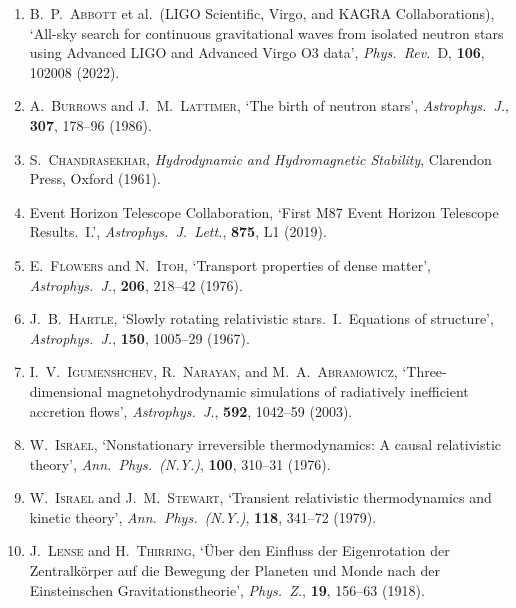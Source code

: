 \begin{enumerate}
\item B.~P.~\textsc{Abbott} et al.\ (LIGO Scientific, Virgo, and
  KAGRA Collaborations), `All-sky search for continuous gravitational
  waves from isolated neutron stars using Advanced LIGO and Advanced
  Virgo O3 data', \emph{Phys.\ Rev.}~D, \textbf{106}, 102008 (2022).

\item A.~\textsc{Burrows} and J.~M.~\textsc{Lattimer}, `The birth of
  neutron stars', \emph{Astrophys.\ J.}, \textbf{307}, 178--96 (1986).

\item S.~\textsc{Chandrasekhar}, \emph{Hydrodynamic and
  Hydromagnetic Stability}, Clarendon Press, Oxford (1961).

\item Event Horizon Telescope Collaboration, `First M87 Event Horizon
  Telescope Results.\ I.', \emph{Astrophys.\ J.\ Lett.}, \textbf{875},
  L1 (2019).

\item E.~\textsc{Flowers} and N.~\textsc{Itoh}, `Transport properties
  of dense matter', \emph{Astrophys.\ J.}, \textbf{206}, 218--42 (1976).

\item J.~B.~\textsc{Hartle}, `Slowly rotating relativistic stars.\
  I.\ Equations of structure', \emph{Astrophys.\ J.}, \textbf{150},
  1005--29 (1967).

\item I.~V.~\textsc{Igumenshchev}, R.~\textsc{Narayan}, and
  M.~A.~\textsc{Abramowicz}, `Three-dimensional magnetohydrodynamic
  simulations of radiatively inefficient accretion flows',
  \emph{Astrophys.\ J.}, \textbf{592}, 1042--59 (2003).

\item W.~\textsc{Israel}, `Nonstationary irreversible thermodynamics:
  A causal relativistic theory', \emph{Ann.\ Phys.\ (N.Y.)},
  \textbf{100}, 310--31 (1976).

\item W.~\textsc{Israel} and J.~M.~\textsc{Stewart}, `Transient
  relativistic thermodynamics and kinetic theory',
  \emph{Ann.\ Phys.\ (N.Y.)}, \textbf{118}, 341--72 (1979).

\item J.~\textsc{Lense} and H.~\textsc{Thirring}, `\"Uber den
  Einfluss der Eigenrotation der Zentralk\"orper auf die Bewegung der
  Planeten und Monde nach der Einsteinschen Gravitationstheorie',
  \emph{Phys.\ Z.}, \textbf{19}, 156--63 (1918).


\end{enumerate}
